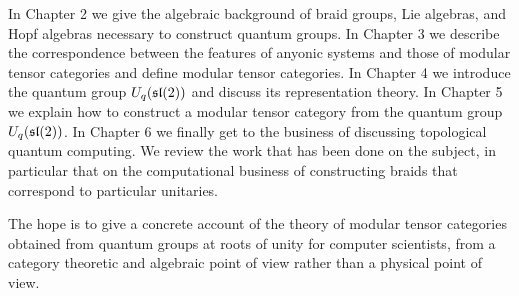 

In Chapter 2 we give the algebraic background of braid groups, Lie algebras,
and Hopf algebras necessary to construct quantum groups. In Chapter 3 we describe the
correspondence between the features of anyonic systems and those of modular
tensor categories and define modular tensor categories.  In
Chapter 4 we introduce the quantum group $U_q(\mathfrak{sl}(2))$ and discuss its
representation theory. In
Chapter 5 we explain how to construct a modular tensor category from the
quantum group $U_q(\mathfrak{sl}(2))$. In Chapter 6 we finally get to the business of
discussing topological quantum computing. We review the work that has been done
on the subject, in particular that on the computational business of
constructing braids that correspond to particular unitaries. 

The hope is to give a concrete account of the theory of modular tensor
categories obtained from quantum groups at roots of unity for computer
scientists, from a category theoretic and algebraic point of view rather than a
physical point of view. 
